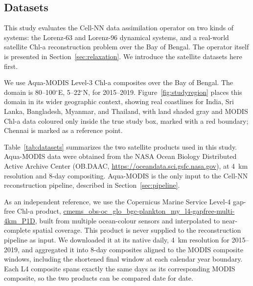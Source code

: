 \documentclass[final,5p,times,twocolumn,authoryear]{elsarticle}
\begin{document}
\subsection{Datasets}
\label{sec:datasets}

This study evaluates the Cell-NN data assimilation operator on two
kinds of systems: the Lorenz-63 and Lorenz-96 dynamical systems, and
a real-world satellite Chl-a reconstruction problem over the Bay of
Bengal. The operator itself is presented in
Section~\ref{sec:relaxation}. We introduce the satellite datasets
here first.

We use Aqua-MODIS Level-3 Chl-a composites over the Bay of Bengal.
The domain is 80--100$^{\circ}$E, 5--22$^{\circ}$N, for 2015--2019.
Figure~\ref{fig:studyregion} places this domain in its wider
geographic context, showing real coastlines for India, Sri Lanka,
Bangladesh, Myanmar, and Thailand, with land shaded gray and MODIS
Chl-a data coloured only inside the true study box, marked with a
red boundary; Chennai is marked as a reference point.

Table~\ref{tab:datasets} summarizes the two satellite products used
in this study. Aqua-MODIS data were obtained from the NASA Ocean
Biology Distributed Active Archive Center (OB.DAAC,
\url{https://oceandata.sci.gsfc.nasa.gov}), at 4~km resolution and
8-day compositing. Aqua-MODIS is the only input to the Cell-NN
reconstruction pipeline, described in Section~\ref{sec:pipeline}.

As an independent reference, we use the Copernicus Marine Service
Level-4 gap-free Chl-a product,
\url{cmems\_obs-oc\_glo\_bgc-plankton\_my\_l4-gapfree-multi-4km\_P1D},
built from multiple ocean-colour sensors and interpolated to
near-complete spatial coverage. This product is never supplied to
the reconstruction pipeline as input. We downloaded it at its
native daily, 4~km resolution for 2015--2019, and aggregated it into
8-day composites aligned to the MODIS composite windows, including
the shortened final window at each calendar year boundary. Each L4
composite spans exactly the same days as its corresponding MODIS
composite, so the two products can be compared date for date.
\end{document}
